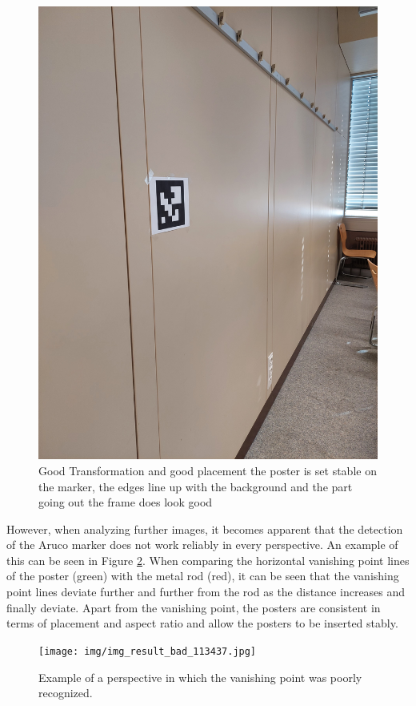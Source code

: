 \documentclass[a4paper,twocolumn]{article}
\begin{document}
    \begin{figure}[h!]
    \centering
    \includegraphics[width=0.9\columnwidth]{img/20221115_113440.jpg} %
    \caption{Good Transformation and good placement the poster is set stable on the marker, the edges line up with the background and the part going out the frame does look good}
    \label{fig:20221115_113440.jpg}
    \end{figure}
    


However, when analyzing further images, it becomes apparent that the detection of the Aruco marker does not work reliably in every perspective. An example of this can be seen in Figure \ref{fig:bad-example-result}. When comparing the horizontal vanishing point lines of the poster (green) with the metal rod (red), it can be seen that the vanishing point lines deviate further and further from the rod as the distance increases and finally deviate.
Apart from the vanishing point, the posters are consistent in terms of placement and aspect ratio and allow the posters to be inserted stably.\begin{figure}[h!]
    \centering
    \texttt{[image: img/img\_result\_bad\_113437.jpg]} %
    \caption{Example of a perspective in which the vanishing point was poorly recognized.}
    \label{fig:bad-example-result}
\end{figure}
\end{document}
